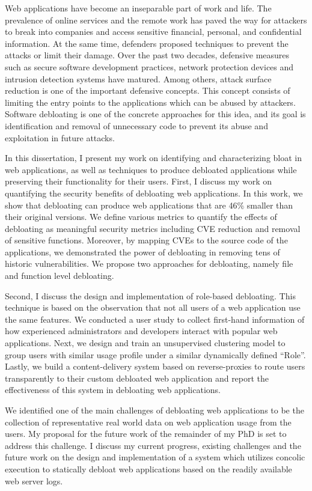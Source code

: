 Web applications have become an inseparable part of work and life. 
The prevalence of online services and the remote work has paved the way for attackers to break into companies and access sensitive financial, personal, and confidential information. 
At the same time, defenders proposed techniques to prevent the attacks or limit their damage. 
Over the past two decades, defensive measures such as secure software development practices, network protection devices and intrusion detection systems have matured. 
Among others, attack surface reduction is one of the important defensive concepts. 
This concept consists of limiting the entry points to the applications which can be abused by attackers. 
Software debloating is one of the concrete approaches for this idea, and its goal is identification and removal of unnecessary code to prevent its abuse and exploitation in future attacks. 

In this dissertation, I present my work on identifying and characterizing bloat in web applications, as well as techniques to produce debloated applications while preserving their functionality for their users. 
First, I discuss my work on quantifying the security benefits of debloating web applications. 
In this work, we show that debloating can produce web applications that are 46\% smaller than their original versions. 
We define various metrics to quantify the effects of debloating as meaningful security metrics including CVE reduction and removal of sensitive functions. 
Moreover, by mapping CVEs to the source code of the applications, we demonstrated the power of debloating in removing tens of historic vulnerabilities. 
We propose two approaches for debloating, namely file and function level debloating. 

Second, I discuss the design and implementation of role-based debloating. 
This technique is based on the observation that not all users of a web application use the same features. 
We conducted a user study to collect first-hand information of how experienced administrators and developers interact with popular web applications. 
Next, we design and train an unsupervised clustering model to group users with similar usage profile under a similar dynamically defined ``Role''. 
Lastly, we build a content-delivery system based on reverse-proxies to route users transparently to their custom debloated web application and report the effectiveness of this system in debloating web applications. 

We identified one of the main challenges of debloating web applications to be the collection of representative real world data on web application usage from the users. My proposal for the future work of the remainder of my PhD is set to address this challenge. 
I discuss my current progress, existing challenges and the future work on the design and implementation of a system which utilizes concolic execution to statically debloat web applications based on the readily available web server logs. 

